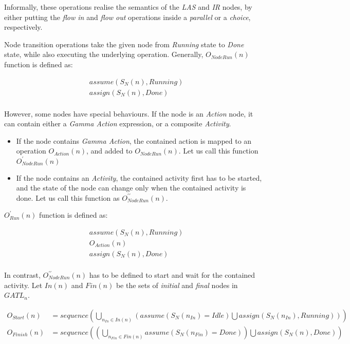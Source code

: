 Informally, these operations realise the semantics of the \emph{LAS} and \emph{IR} nodes, by either putting the \emph{flow in} and \emph{flow out} operations inside a \emph{parallel} or a \emph{choice}, respectively.

\begin{definition}
	Node transition operations take the given node from \emph{Running} state to \emph{Done} state, while also executing the underlying operation. Generally, \(O_\mathit{NodeRun}(n)\) function is defined as:
	
	\begin{align*}
		&\mathit{assume}(S_N(n), \mathit{Running}) \\
		&\mathit{assign}(S_N(n), \mathit{Done}) \\
	\end{align*}

	However, some nodes have special behaviours. If the node is an \emph{Action} node, it can contain either a \emph{Gamma Action} expression, or a composite \emph{Activity}.

	\begin{itemize}
		\item If the node contains \emph{Gamma Action}, the contained action is mapped to an operation \(O_\mathit{Action}(n)\), and added to \( O_\mathit{NodeRun}(n) \). Let us call this function \(O_\mathit{NodeRun}^\prime(n)\)
		\item If the node contains an \emph{Activity}, the contained activity first has to be started, and the state of the node can change only when the contained activity is done. Let us call this function as \(O_\mathit{NodeRun}^{\prime\prime}(n)\).
	\end{itemize}
	\clearpage
	\(O_\mathit{Run}^\prime(n)\) function is defined as:
	
	\begin{align*}
		&\mathit{assume}(S_N(n), \mathit{Running}) \\
		&O_\mathit{Action}(n) \\
		&\mathit{assign}(S_N(n), \mathit{Done}) \\
	\end{align*}

	In contrast, \(O_\mathit{NodeRun}^{\prime\prime}(n)\) has to be defined to start and wait for the contained activity. Let \(\mathit{In}(n)\) and \(\mathit{Fin}(n)\) be the sets of \emph{initial} and \emph{final} nodes in \(\mathit{GATL}_\mathit{n}\). 
	
	\begin{align*}
		O_\mathit{Start}(n) &= \mathit{sequence}\left(
			\bigcup_{n_\mathit{In} \in \mathit{In}(n)} \left(\mathit{assume}(S_N(n_\mathit{In}) = \mathit{Idle}) \bigcup \mathit{assign}(S_N(n_\mathit{In}), \mathit{Running})
		\right)\right)\\
		O_\mathit{Finish}(n) &= \mathit{sequence}\left(
			\left(\bigcup_{n_\mathit{Fin} \in \mathit{Fin}(n)} \mathit{assume}(S_N(n_\mathit{Fin}) = \mathit{Done})\right) \bigcup \mathit{assign}(S_N(n), \mathit{Done})
		\right)
	\end{align*}


\end{definition}
